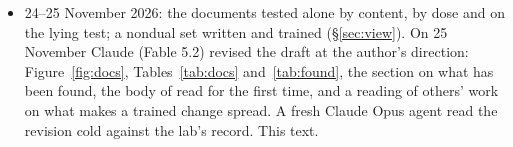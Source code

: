\documentclass[11pt]{article}
\begin{document}
\begin{itemize}[leftmargin=*]
  \item 24--25 November 2026: the documents tested alone by content, by dose and on the lying test; a nondual set written and trained (\S\ref{sec:view}). On 25 November Claude (Fable 5.2) revised the draft at the author's direction: Figure~\ref{fig:docs}, Tables~\ref{tab:docs} and~\ref{tab:found}, the section on what has been found, the body of \citet{laukkonen2025contemplative} read for the first time, and a reading of others' work on what makes a trained change spread. A fresh Claude Opus agent read the revision cold against the lab's record. This text.
\end{itemize}
\end{document}
